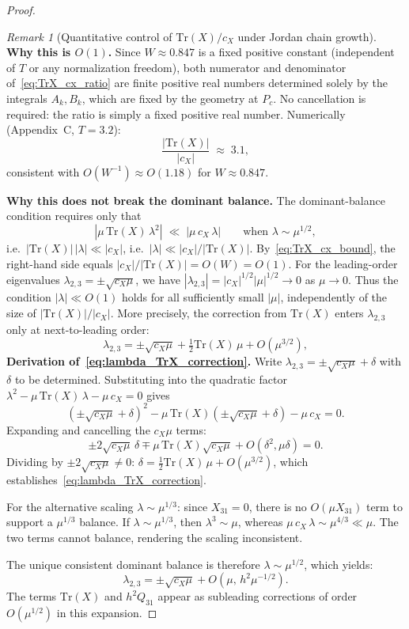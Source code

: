 \documentclass[12pt,a4paper]{amsart}
\theoremstyle{remark}
\newtheorem{remark}[theorem]{Remark}
\begin{document}
\begin{proof}
\begin{remark}[Quantitative control of $\mathrm{Tr}(X)/c_X$ under Jordan chain growth]
\medskip
\noindent\textbf{Why this is $O(1)$.}
Since $W \approx 0.847$ is a fixed positive constant (independent of $T$ or any
normalization freedom), both numerator and denominator of~\eqref{eq:TrX_cx_ratio}
are finite positive real numbers determined solely by the integrals $A_k, B_k$,
which are fixed by the geometry at $P_c$.
No cancellation is required: the ratio is simply a fixed positive real number.
Numerically (Appendix~C, $T = 3.2$):
\[
  \frac{|\mathrm{Tr}(X)|}{|c_X|} \;\approx\; 3.1,
\]
consistent with $O(W^{-1}) \approx O(1.18)$ for $W \approx 0.847$.

\medskip
\noindent\textbf{Why this does not break the dominant balance.}
The dominant-balance condition requires only that
\[
  \left|\mu\,\mathrm{Tr}(X)\,\lambda^2\right|
  \;\ll\;
  \left|\mu\,c_X\,\lambda\right|
  \qquad\text{when } \lambda \sim \mu^{1/2},
\]
i.e.\ $|\mathrm{Tr}(X)|\,|\lambda| \ll |c_X|$, i.e.\ $|\lambda| \ll |c_X|/|\mathrm{Tr}(X)|$.
By~\eqref{eq:TrX_cx_bound}, the right-hand side equals $|c_X|/|\mathrm{Tr}(X)| = O(W) = O(1)$.
For the leading-order eigenvalues $\lambda_{2,3} = \pm\sqrt{c_X\mu}$, we have
$|\lambda_{2,3}| = |c_X|^{1/2}|\mu|^{1/2} \to 0$ as $\mu \to 0$.
Thus the condition $|\lambda| \ll O(1)$ holds for all sufficiently small $|\mu|$,
independently of the size of $|\mathrm{Tr}(X)|/|c_X|$.
More precisely, the correction from $\mathrm{Tr}(X)$ enters $\lambda_{2,3}$ only at
next-to-leading order:
\begin{equation}\label{eq:lambda_TrX_correction}
  \lambda_{2,3} = \pm\sqrt{c_X\mu} + \tfrac{1}{2}\mathrm{Tr}(X)\,\mu + O(\mu^{3/2}),
\end{equation}
\medskip
\noindent\textbf{Derivation of~\eqref{eq:lambda_TrX_correction}.}
Write $\lambda_{2,3} = \pm\sqrt{c_X\mu} + \delta$ with $\delta$ to be determined.
Substituting into the quadratic factor $\lambda^2 - \mu\,\mathrm{Tr}(X)\,\lambda - \mu\,c_X = 0$ gives
\[
  (\pm\sqrt{c_X\mu}+\delta)^2
  - \mu\,\mathrm{Tr}(X)(\pm\sqrt{c_X\mu}+\delta)
  - \mu\,c_X = 0.
\]
Expanding and cancelling the $c_X\mu$ terms:
\[
  \pm 2\sqrt{c_X\mu}\,\delta
  \mp \mu\,\mathrm{Tr}(X)\sqrt{c_X\mu}
  + O(\delta^2, \mu\delta) = 0.
\]
Dividing by $\pm 2\sqrt{c_X\mu} \neq 0$:
$\delta = \tfrac{1}{2}\mathrm{Tr}(X)\,\mu + O(\mu^{3/2})$,
which establishes~\eqref{eq:lambda_TrX_correction}.
\end{remark}

For the alternative scaling $\lambda \sim \mu^{1/3}$: since $X_{31}=0$, there is no $O(\mu X_{31})$ term to
support a $\mu^{1/3}$ balance. If $\lambda \sim \mu^{1/3}$, then $\lambda^3 \sim \mu$, whereas
$\mu\,c_X\,\lambda \sim \mu^{4/3} \ll \mu$. The two terms cannot balance, rendering the scaling
inconsistent.

The unique consistent dominant balance is therefore $\lambda \sim \mu^{1/2}$, which yields:
\begin{equation}\label{eq:lambdapm}
  \lambda_{2,3} = \pm\sqrt{c_X\mu} + O(\mu,\, h^2\mu^{-1/2}).
\end{equation}
The terms $\mathrm{Tr}(X)$ and $h^2 Q_{31}$ appear as subleading corrections of order
$O(\mu^{1/2})$ in this expansion.
\end{proof}
\end{document}
